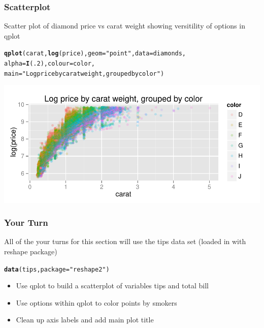 \documentclass{beamer}\usepackage[]{graphicx}\usepackage[]{color}
\makeatletter
\newcommand{\hlnum}[1]{\textcolor[rgb]{0.686,0.059,0.569}{#1}}%
\newcommand{\hlstr}[1]{\textcolor[rgb]{0.192,0.494,0.8}{#1}}%
\newcommand{\hlstd}[1]{\textcolor[rgb]{0.345,0.345,0.345}{#1}}%
\newcommand{\hlkwc}[1]{\textcolor[rgb]{0.333,0.667,0.333}{#1}}%
\newcommand{\hlkwd}[1]{\textcolor[rgb]{0.737,0.353,0.396}{\textbf{#1}}}%
\newenvironment{kframe}{%
 \def\at@end@of@kframe{}%
 \ifinner\ifhmode%
  \def\at@end@of@kframe{\end{minipage}}%
  \begin{minipage}{\columnwidth}%
 \fi\fi%
 \def\FrameCommand##1{\hskip\@totalleftmargin \hskip-\fboxsep
 \colorbox{shadecolor}{##1}\hskip-\fboxsep
     \hskip-\linewidth \hskip-\@totalleftmargin \hskip\columnwidth}%
 \MakeFramed {\advance\hsize-\width
   \@totalleftmargin\z@ \linewidth\hsize
   \@setminipage}}%
 {\par\unskip\endMakeFramed%
 \at@end@of@kframe}
\newenvironment{knitrout}{}{} %
\makeatother
\begin{document}
\begin{frame}[fragile]
\frametitle{Scatterplot}
    
    Scatter plot of diamond price vs carat weight showing versitility of options in qplot
    
\footnotesize
\begin{knitrout}\footnotesize
{}\color{fgcolor}\begin{kframe}
\begin{alltt}
\hlkwd{qplot}\hlstd{(carat,} \hlkwd{log}\hlstd{(price),} \hlkwc{geom}\hlstd{=}\hlstr{"point"}\hlstd{,} \hlkwc{data}\hlstd{=diamonds,}
        \hlkwc{alpha}\hlstd{=}\hlkwd{I}\hlstd{(}\hlnum{.2}\hlstd{),} \hlkwc{colour}\hlstd{=color,}
        \hlkwc{main}\hlstd{=}\hlstr{"Log price by carat weight, grouped by color"}\hlstd{)}
\end{alltt}
\end{kframe}

{\centering \includegraphics[width=.9\linewidth]{figure/kdiamondscatter2} 

}



\end{knitrout}
\normalsize
\end{frame}


\begin{frame}
\frametitle{Your Turn}

All of the your turns for this section will use the tips data set (loaded in with reshape package)
  
\begin{knitrout}\footnotesize
{}\color{fgcolor}\begin{kframe}
\begin{alltt}
\hlkwd{data}\hlstd{(tips,} \hlkwc{package}\hlstd{=}\hlstr{"reshape2"}\hlstd{)}
\end{alltt}
\end{kframe}
\end{knitrout}

\begin{itemize}
  \item Use qplot to build a scatterplot of variables tips and total bill\medskip
  \item Use options within qplot to color points by smokers\medskip
  \item Clean up axis labels and add main plot title\medskip
\end{itemize}

\end{frame}
\end{document}
